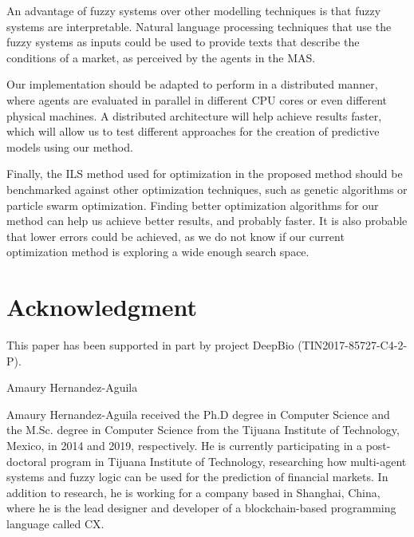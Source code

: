 \documentclass{ieeeaccess}
\begin{document}
An advantage of fuzzy systems over other modelling techniques is that
fuzzy systems are interpretable. Natural language processing
techniques that use the fuzzy systems as inputs could be used to
provide texts that describe the conditions of a market, as perceived
by the agents in the MAS.

Our implementation should be adapted to perform in a distributed
manner, where agents are evaluated in parallel in different CPU cores
or even different physical machines. A distributed architecture will
help achieve results faster, which will allow us to test different
approaches for the creation of predictive models using our method.

Finally, the ILS method used for optimization in the proposed method should be
benchmarked against other optimization techniques, such as genetic
algorithms or particle swarm optimization. Finding better optimization
algorithms for our method can help us achieve better results, and probably faster. It is
also probable that lower errors could be achieved, as we do not know
if our current optimization method is exploring a wide enough search space.

\section*{Acknowledgment}
This paper has been supported in part by project DeepBio (TIN2017-85727-C4-2-P).

\begin{IEEEbiography}{Amaury
  Hernandez-Aguila}

  Amaury Hernandez-Aguila received the Ph.D degree in Computer Science and the
  M.Sc. degree in Computer Science from the Tijuana Institute of Technology,
  Mexico, in 2014 and 2019, respectively. He is currently participating in a
  post-doctoral program in Tijuana Institute of Technology, researching how
  multi-agent systems and fuzzy logic can be used for the prediction of
  financial markets. In addition to research, he is working for a company based
  in Shanghai, China, where he is the lead designer and developer of a
  blockchain-based programming language called CX.

\end{IEEEbiography}
\end{document}
